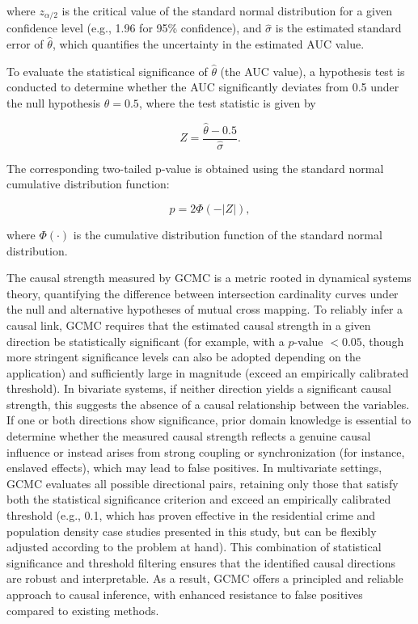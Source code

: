 \documentclass[authoryear,preprint,review,12pt]{elsarticle}
\begin{document}
\noindent where \( z_{\alpha/2} \) is the critical value of the standard normal distribution for a given confidence level (e.g., 1.96 for 95\% confidence), and \(\hat{\sigma} \) is the estimated standard error of \(\hat{\theta}\), which quantifies the uncertainty in the estimated AUC value.

To evaluate the statistical significance of \(\hat{\theta}\) (the AUC value), a hypothesis test is conducted to determine whether the AUC significantly deviates from 0.5 under the null hypothesis \(\theta = 0.5\), where the test statistic is given by

\begin{equation}
Z = \frac{\hat{\theta} - 0.5}{\hat{\sigma}}.
\end{equation}

The corresponding two-tailed p-value is obtained using the standard normal cumulative distribution function:

\begin{equation}
p = 2 \Phi(-|Z|),
\end{equation}

\noindent where \(\Phi(\cdot)\) is the cumulative distribution function of the standard normal distribution.

The causal strength measured by GCMC is a metric rooted in dynamical systems theory, quantifying the difference between intersection cardinality curves under the null and alternative hypotheses of mutual cross mapping. To reliably infer a causal link, GCMC requires that the estimated causal strength in a given direction be statistically significant (for example, with a $p$-value $< 0.05$, though more stringent significance levels can also be adopted depending on the application) and sufficiently large in magnitude (exceed an empirically calibrated threshold). In bivariate systems, if neither direction yields a significant causal strength, this suggests the absence of a causal relationship between the variables. If one or both directions show significance, prior domain knowledge is essential to determine whether the measured causal strength reflects a genuine causal influence or instead arises from strong coupling or synchronization (for instance, enslaved effects), which may lead to false positives. In multivariate settings, GCMC evaluates all possible directional pairs, retaining only those that satisfy both the statistical significance criterion and exceed an empirically calibrated threshold (e.g., 0.1, which has proven effective in the residential crime and population density case studies presented in this study, but can be flexibly adjusted according to the problem at hand). This combination of statistical significance and threshold filtering ensures that the identified causal directions are robust and interpretable. As a result, GCMC offers a principled and reliable approach to causal inference, with enhanced resistance to false positives compared to existing methods.
\end{document}
